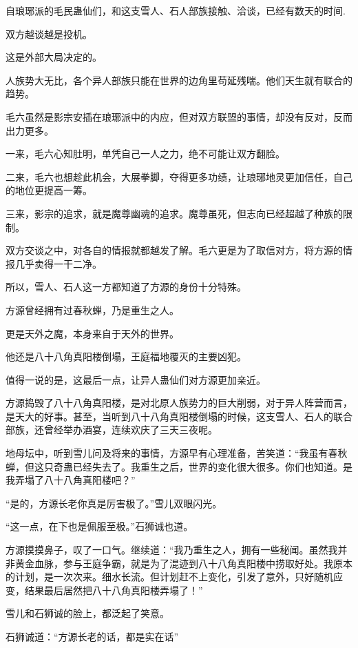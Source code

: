 
\begin{this_body}

自琅琊派的毛民蛊仙们，和这支雪人、石人部族接触、洽谈，已经有数天的时间.

双方越谈越是投机。

这是外部大局决定的。

人族势大无比，各个异人部族只能在世界的边角里苟延残喘。他们天生就有联合的趋势。

毛六虽然是影宗安插在琅琊派中的内应，但对双方联盟的事情，却没有反对，反而出力更多。

一来，毛六心知肚明，单凭自己一人之力，绝不可能让双方翻脸。

二来，毛六也想趁此机会，大展拳脚，夺得更多功绩，让琅琊地灵更加信任，自己的地位更提高一筹。

三来，影宗的追求，就是魔尊幽魂的追求。魔尊虽死，但志向已经超越了种族的限制。

双方交谈之中，对各自的情报就都越发了解。毛六更是为了取信对方，将方源的情报几乎卖得一干二净。

所以，雪人、石人这一方都知道了方源的身份十分特殊。

方源曾经拥有过春秋蝉，乃是重生之人。

更是天外之魔，本身来自于天外的世界。

他还是八十八角真阳楼倒塌，王庭福地覆灭的主要凶犯。

值得一说的是，这最后一点，让异人蛊仙们对方源更加亲近。

方源捣毁了八十八角真阳楼，是对北原人族势力的巨大削弱，对于异人阵营而言，是天大的好事。甚至，当听到八十八角真阳楼倒塌的时候，这支雪人、石人的联合部族，还曾经举办酒宴，连续欢庆了三天三夜呢。

地母坛中，听到雪儿问及将来的事情，方源早有心理准备，苦笑道：“我虽有春秋蝉，但这只奇蛊已经失去了。我重生之后，世界的变化很大很多。你们也知道。是我弄塌了八十八角真阳楼吧？”

“是的，方源长老你真是厉害极了。”雪儿双眼闪光。

“这一点，在下也是佩服至极。”石狮诚也道。

方源摸摸鼻子，叹了一口气。继续道：“我乃重生之人，拥有一些秘闻。虽然我并非黄金血脉，参与王庭争霸，就是为了混迹到八十八角真阳楼中捞取好处。我原本的计划，是一次次来。细水长流。但计划赶不上变化，引发了意外，只好随机应变，结果最后居然把八十八角真阳楼弄塌了！”

雪儿和石狮诚的脸上，都泛起了笑意。

石狮诚道：“方源长老的话，都是实在话”


\end{this_body}
